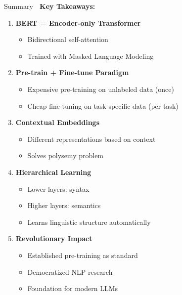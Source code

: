\documentclass[aspectratio=169]{beamer}
\begin{document}
\begin{frame}[shrink=10]{Summary 🎯}
\textbf{Key Takeaways:}

\vspace{1em}

\begin{enumerate}\setlength{\itemsep}{0pt}
    \item \textbf{BERT = Encoder-only Transformer}
    \begin{itemize}\setlength{\itemsep}{0pt}
        \item Bidirectional self-attention
        \item Trained with Masked Language Modeling
    \end{itemize}

    \item \textbf{Pre-train + Fine-tune Paradigm}
    \begin{itemize}\setlength{\itemsep}{0pt}
        \item Expensive pre-training on unlabeled data (once)
        \item Cheap fine-tuning on task-specific data (per task)
    \end{itemize}

    \item \textbf{Contextual Embeddings}
    \begin{itemize}\setlength{\itemsep}{0pt}
        \item Different representations based on context
        \item Solves polysemy problem
    \end{itemize}

    \item \textbf{Hierarchical Learning}
    \begin{itemize}\setlength{\itemsep}{0pt}
        \item Lower layers: syntax
        \item Higher layers: semantics
        \item Learns linguistic structure automatically
    \end{itemize}

    \item \textbf{Revolutionary Impact}
    \begin{itemize}\setlength{\itemsep}{0pt}
        \item Established pre-training as standard
        \item Democratized NLP research
        \item Foundation for modern LLMs
    \end{itemize}
\end{enumerate}
\end{frame}
\end{document}
